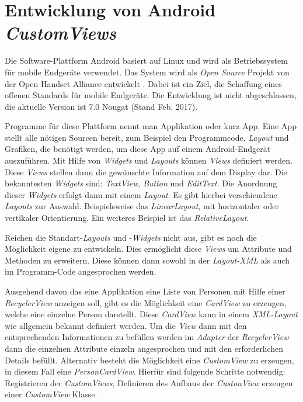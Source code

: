 \section{Entwicklung von Android \textit{CustomViews}}\label{sec:custom_view}
Die Software-Plattform Android basiert auf Linux und wird als Betriebssystem für mobile Endgeräte verwendet.
Das System wird als \textit{Open Source} Projekt von der Open Handset Alliance entwickelt \cite{open_handset_alliance}. Dabei ist ein Ziel, die Schaffung eines offenen Standards für mobile Endgeräte.
Die Entwicklung ist nicht abgeschlossen, die aktuelle Version ist 7.0 Nougat (Stand Feb. 2017).

Programme für diese Plattform nennt man Applikation oder kurz App. Eine App stellt alle nötigen Sourcen bereit, zum Beispiel den Programmcode, \textit{Layout} und Grafiken, die benötigt werden, um diese App auf einem Android-Endgerät auszuführen.
Mit Hilfe von \textit{Widgets} und \textit{Layouts} können \textit{Views} definiert werden. Diese \textit{Views} stellen dann die gewünschte Information auf dem Display dar. Die bekanntesten \textit{Widgets} sind: \textit{TextView}, \textit{Button} und \textit{EditText}. Die Anordnung dieser \textit{Widgets} erfolgt dann mit einem \textit{Layout}. Es gibt hierbei verschiendene \textit{Layouts} zur Auswahl. Beispielsweise das \textit{LinearLayout}, mit horizontaler oder vertikaler Orientierung. Ein weiteres Beispiel ist das \textit{RelativeLayout}.

Reichen die Standart-\textit{Layouts} und -\textit{Widgets} nicht aus, gibt es noch die Möglichkeit eigene zu entwickeln. Dies ermöglicht diese \textit{Views} um Attribute und Methoden zu erweitern. Diese können dann sowohl in der \textit{Layout-XML} als auch im Programm-Code angesprochen werden.

Ausgehend davon das eine Applikation eine Liste von Personen mit Hilfe einer \textit{RecyclerView} anzeigen soll, gibt es die Möglichkeit eine \textit{CardView} zu erzeugen, welche eine einzelne Person darstellt. Diese \textit{CardView} kann in einem \textit{XML-Layout} wie allgemein bekannt definiert werden. Um die \textit{View} dann mit den entsprechenden Informationen zu befüllen werden im \textit{Adapter} der \textit{RecyclerView} dann die einzelnen Attribute einzeln angesprochen und mit den erforderlichen Details befüllt.
Alternativ besteht die Möglichkeit eine \textit{CustomView} zu erzeugen, in diesem Fall eine \textit{PersonCardView}.
Hierfür sind folgende Schritte notwendig: Registrieren der \textit{CustomViews}, Definieren des Aufbaus der \textit{CustonView} erzeugen einer \textit{CustomView} Klasse.

